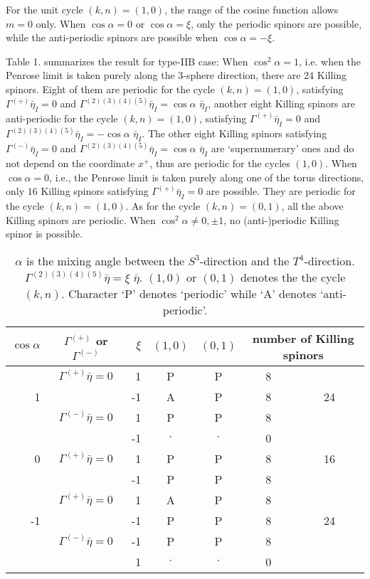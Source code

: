 \documentclass[a4paper,12pt]{article}
\begin{document}
For the unit cycle $(k, n)=(1, 0)$, the range of the cosine function allows $m=0$ only. When $\cos{\alpha}=0$ or $\cos{\alpha}=\xi$, only the periodic spinors are possible, while the anti-periodic spinors are possible when $\cos{\alpha}=-\xi$. 

Table 1. summarizes the result for type-IIB case: When $\cos^2{\alpha}=1$, i.e. when the Penrose limit is taken purely along the 3-sphere direction, there are $24$ Killing spinors. Eight of them are periodic for the cycle $(k, n)=(1, 0)$, satisfying $\Gamma^{(+)}\bar{\eta}_I=0$ and $\Gamma^{(2)(3)(4)(5)}\bar{\eta}_I=\cos{\alpha}\,\,\bar{\eta}_I$, another eight Killing spinors are anti-periodic for the cycle $(k, n)=(1, 0)$, satisfying $\Gamma^{(+)}\bar{\eta}_I=0$ and $\Gamma^{(2)(3)(4)(5)}\bar{\eta}_I=-\cos{\alpha}\,\,\bar{\eta}_I$. The other eight Killing spinors satisfying $\Gamma^{(-)}\bar{\eta}_I=0$ and $\Gamma^{(2)(3)(4)(5)}\bar{\eta}_I=\cos{\alpha}\,\,\bar{\eta}_I$ are `supernumerary' ones and do not depend on the coordinate $x^+$, thus are periodic for the cycles $(1, 0)$. When $\cos{\alpha}=0$, i.e., the Penrose limit is taken purely along one of the torus directions, only $16$ Killing spinors satisfying $\Gamma^{(+)}\bar{\eta}_I=0$ are possible. They are periodic for the cycle $(k, n)=(1, 0)$. As for the cycle $(k, n)=(0, 1)$, all the above Killing spinors are periodic. When $\cos^2{\alpha}\ne 0, \pm1$, no (anti-)periodic Killing spinor is possible. 

\begin{table}[h]
\begin{tabular}{||r|c|r|c|c|c|c||}
\hline\hline
$\cos{\alpha}$&$\Gamma^{(+)}$ or $\Gamma^{(-)}$&$\xi$&$(1,0)$&$(0,1)$&\multicolumn{2}{c||}{ number of Killing spinors}\\ \hline
 & $\Gamma^{(+)}\bar{\eta}=0$ & 1 &  P & P & 8 & \\ \cline{3-6}
 1 &                        &-1 & A & P & 8 & 24  \\ \cline{2-6}
  & $\Gamma^{(-)}\bar{\eta}=0$ & 1 & P & P & 8 &   \\ \cline{3-6}
  &                        &-1 &$\cdot$  & $\cdot$  &0 &\\ \hline\hline
0 & $\Gamma^{(+)}\bar{\eta}=0$ &  1 & P & P & 8 & 16\\ \cline{3-6}
  &                        & -1 & P & P & 8& \\ \hline\hline
& $\Gamma^{(+)}\bar{\eta}=0$ & 1 &  A & P & 8 & \\ \cline{3-6}
 -1 &                        &-1 &  P & P & 8 & 24  \\ \cline{2-6}
  & $\Gamma^{(-)}\bar{\eta}=0$ & -1 &  P & P & 8 &   \\ \cline{3-6}
  &                        &1 & $\cdot$  & $\cdot$  &0 &\\ \hline\hline
\end{tabular}
\caption{\footnotesize $\alpha$ is the mixing angle between the $S^3$-direction and the $T^4$-direction. $\Gamma^{(2)(3)(4)(5)}\bar{\eta}=\xi\,\,\bar{\eta}$.
$(1, 0)$ or $(0, 1)$ denotes the the cycle $(k, n)$. Character `P' denotes `periodic' while `A' denotes `anti-periodic'.}
\end{table}
\end{document}

